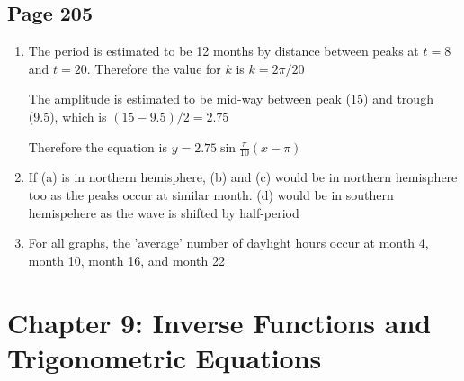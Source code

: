 \documentclass{article}
\newenvironment{solutions}[1]
{\subsection*{#1}
 \begin{enumerate}[leftmargin=1.5em]}
{\end{enumerate}}
\newcommand{\solution}{\item}
\begin{document}
\begin{solutions}{Page 205}
\solution
The period is estimated to be 12 months by distance between peaks at $t=8$ and $t=20$. Therefore the value for $k$ is $k=2\pi/20$

The amplitude is estimated to be mid-way between peak (15) and trough (9.5), which is $(15-9.5)/2 =2.75 $

Therefore the equation is $y=2.75 \sin \frac{\pi}{10}(x-\pi)$

\solution
If (a) is in northern hemisphere, (b) and (c) would be in northern hemisphere too as the peaks occur at similar month. (d) would be in southern hemispehere as the wave is shifted by half-period

\solution
For all graphs, the 'average' number of daylight hours occur at month 4, month 10, month 16, and month 22
\end{solutions}

\section*{Chapter 9: Inverse Functions and Trigonometric Equations}
\end{document}

